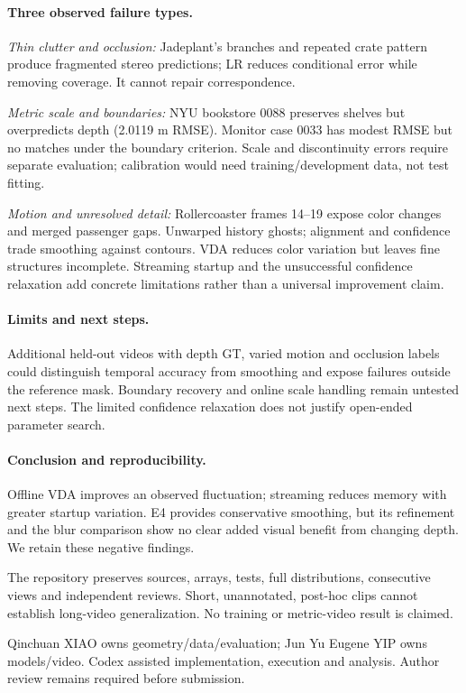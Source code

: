 \documentclass[10pt,twocolumn,letterpaper]{article}
\begin{document}
\paragraph{Three observed failure types.}
\emph{Thin clutter and occlusion:}
Jadeplant's branches and repeated crate pattern produce fragmented stereo predictions; LR reduces conditional error while removing coverage. It cannot repair correspondence.

\emph{Metric scale and boundaries:}
NYU bookstore 0088 preserves shelves but overpredicts depth (2.0119 m RMSE). Monitor case 0033 has modest RMSE but no matches under the boundary criterion. Scale and discontinuity errors require separate evaluation; calibration would need training/development data, not test fitting.

\emph{Motion and unresolved detail:}
Rollercoaster frames 14--19 expose color changes and merged passenger gaps. Unwarped history ghosts; alignment and confidence trade smoothing against contours. VDA reduces color variation but leaves fine structures incomplete. Streaming startup and the unsuccessful confidence relaxation add concrete limitations rather than a universal improvement claim.

\paragraph{Limits and next steps.}
Additional held-out videos with depth GT, varied motion and occlusion labels could distinguish temporal accuracy from smoothing and expose failures outside the reference mask. Boundary recovery and online scale handling remain untested next steps. The limited confidence relaxation does not justify open-ended parameter search.

\paragraph{Conclusion and reproducibility.}
Offline VDA improves an observed fluctuation; streaming reduces memory with greater startup variation. E4 provides conservative smoothing, but its refinement and the blur comparison show no clear added visual benefit from changing depth. We retain these negative findings.

The repository preserves sources, arrays, tests, full distributions, consecutive views and independent reviews. Short, unannotated, post-hoc clips cannot establish long-video generalization. No training or metric-video result is claimed.

Qinchuan XIAO owns geometry/data/evaluation; Jun Yu Eugene YIP owns models/video. Codex assisted implementation, execution and analysis. Author review remains required before submission.
\clearpage
{\small}
\end{document}

